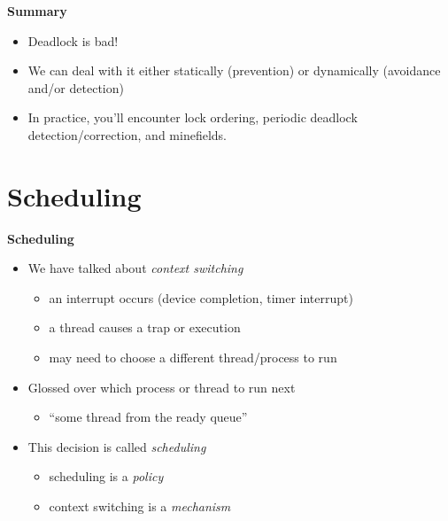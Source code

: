 \documentclass[11pt,a4paper]{article}
\begin{document}
\textbf{Summary}
\begin{itemize}
    \item Deadlock is bad!
    \item We can deal with it either statically (prevention)
        or dynamically (avoidance and/or detection)
    \item In practice, you'll encounter lock ordering, periodic deadlock detection/correction,
        and minefields.
\end{itemize}

\break{}

\section{Scheduling}

\textbf{Scheduling}
\begin{itemize}
    \item We have talked about \emph{context switching}
        \begin{itemize}
            \item an interrupt occurs (device completion, timer interrupt)
            \item a thread causes a trap or execution
            \item may need to choose a different thread/process to run
        \end{itemize}
    \item Glossed over which process or thread to run next
        \begin{itemize}
            \item ``some thread from the ready queue''
        \end{itemize}
    \item This decision is called \emph{scheduling}
        \begin{itemize}
            \item scheduling is a \emph{policy}
            \item context switching is a \emph{mechanism}
        \end{itemize}
\end{itemize}
\end{document}
